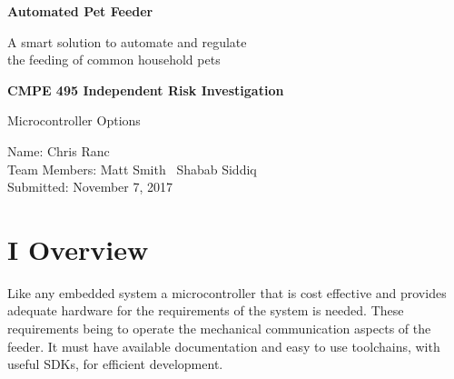 \documentclass[12pt]{article}
\newcommand{\projectDescription}{A smart solution to automate and regulate \\the feeding of common household pets}
\newcommand{\projectTitle}{Automated Pet Feeder}
\newcommand{\yourname}{Chris Ranc}
\newcommand{\myname}{Matt Smith}
\newcommand{\anothername}{Shabab Siddiq}
\newcommand{\dateSubmitted}{November 7, 2017}
\newcommand{\componentDescription}{Microcontroller Options}
\begin{document}
\thispagestyle{empty}
    \vspace*{2.5cm}
    \begin{center}
        \LARGE
        \textbf{\projectTitle}

        \Large
        \projectDescription

    \vspace*{2.5cm}
        \large
        \textbf{CMPE 495 Independent Risk Investigation}

        \componentDescription
    \end{center}

    \vspace*{2cm}

    \begin{multicols}{2}
        \phantom{LaTeX doesn't like empty columns} %
        \columnbreak{}
        \begin{raggedright}

        Name: \yourname\\
        Team Members: \myname\
        \phantom{Team Members:} \anothername\\
        Submitted: \dateSubmitted\\
        \vspace{\baselineskip}
        \end{raggedright}
    \end{multicols}
\newpage
%
%
\renewcommand{\cftaftertoctitle}{\thispagestyle{empty}}
\renewcommand\cftsecleader{\cftdotfill{\cftdotsep}}
\tableofcontents
\newpage

\section{I Overview}
Like any embedded system a microcontroller that is cost effective and provides adequate hardware
for the requirements of the system is needed.  These requirements being to operate the mechanical
communication aspects of the feeder.  It must have available documentation and easy to use
toolchains, with useful SDKs, for efficient development.
\end{document}
